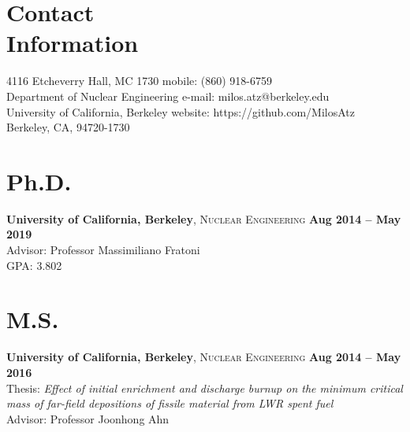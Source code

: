 \documentclass[margin,line]{resume}
\begin{document}
\begin{resume}

\section{\mysidestyle Contact\\Information}
    4116 Etcheverry Hall, MC 1730 
        \hfill mobile: (860) 918-6759 \\
    Department of Nuclear Engineering 
        \hfill e-mail: milos.atz@berkeley.edu \\
    University of California, Berkeley 
        \hfill website: https://github.com/MilosAtz \\
    Berkeley, CA, 94720-1730
    
%
%
%
%

\section{\mysidestyle Ph.D.}
    \textbf{University of California, Berkeley}, 
    \textsc{Nuclear Engineering} \hfill 
    \textbf{Aug 2014 -- May 2019} \vspace{1mm} \\
    Advisor: Professor Massimiliano Fratoni \\
    GPA: 3.802 \\

\section{\mysidestyle M.S.}
    \textbf{University of California, Berkeley}, 
    \textsc{Nuclear Engineering} \hfill 
    \textbf{Aug 2014 -- May 2016} \vspace{1mm} \\
    Thesis: \textsl{Effect of initial enrichment and discharge burnup on the minimum critical mass of far-field depositions of fissile material from LWR spent fuel} \\
    Advisor: Professor Joonhong Ahn \\


\end{resume}
\end{document}
